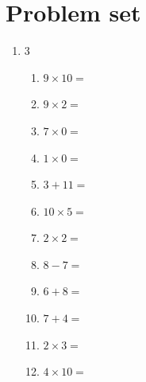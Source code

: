 \documentclass{tufte-book}
\begin{document}
\clearpage\section{Problem set }
\begin{enumerate}
\item
\begin{multicols}{3}
\begin{enumerate}
      \item $9 \times 10=$ \dotfill\bigskip
      \item $9 \times 2=$ \dotfill\bigskip
      \item $7 \times 0=$ \dotfill\bigskip
      \item $1 \times 0=$ \dotfill
      \item $3 + 11=$ \dotfill\bigskip
      \item $10 \times 5=$ \dotfill\bigskip
      \item $2 \times 2=$ \dotfill\bigskip
      \item $8 - 7=$ \dotfill
      \item $6 + 8=$ \dotfill\bigskip
      \item $7 + 4=$ \dotfill\bigskip
      \item $2 \times 3=$ \dotfill\bigskip
      \item $4 \times 10=$ \dotfill
\end{enumerate}
\end{multicols}
\end{enumerate}
\end{document}
